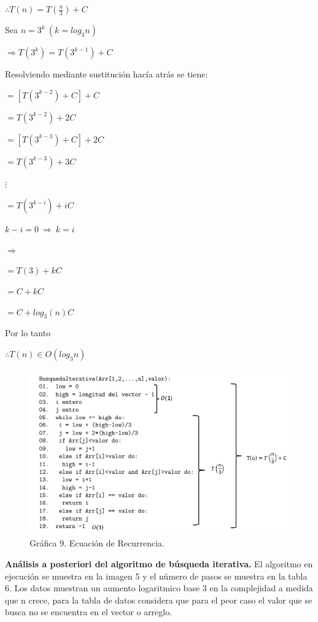 \documentclass[12pt,twoside]{article}
\begin{document}
\begin{center}
  $\therefore T(n)=T(\frac{n}{3})+C$

  Sea $n=3^k\ (k=log_3 n)$
  
  $\Rightarrow T(3^k)=T(3^{k-1})+C$
  \par
  Resolviendo mediante sustitución hacía atrás se tiene:

  $=[T(3^{k-2})+C]+C$

  $=T(3^{k-2})+2C$

  $=[T(3^{k-3})+C]+2C$

  $=T(3^{k-3})+3C$

  $\vdots$

  $=T(3^{k-i})+iC$

  $k-i=0\ \Rightarrow \ k=i$

  $\Rightarrow$
\end{center}
\newpage
\begin{center}
  $=T(3)+kC$

  $=C+kC$

  $=C+log_3(n)C$

  Por lo tanto 
  
  $\therefore T(n)\in O(log_3n)$
\end{center}
\par
\begin{figure}[h]
  \begin{center}
    \includegraphics[width=0.85\linewidth]{images/apriori1.png}
    \\
    Gráfica 9. Ecuación de Recurrencia.
  \end{center}
\end{figure}
\newpage
\textbf{Análisis a posteriori del algoritmo de búsqueda iterativa.}
El algoritmo en ejecución se muestra en la imagen 5 y el número de pasos se muestra en la tabla 6. Los datos
muestran un aumento logaritmico base 3 en la complejidad a medida que n crece, para la tabla de datos considera
que para el peor caso el valor que se busca no se encuentra en el vector o arreglo.
\par
\end{document}
